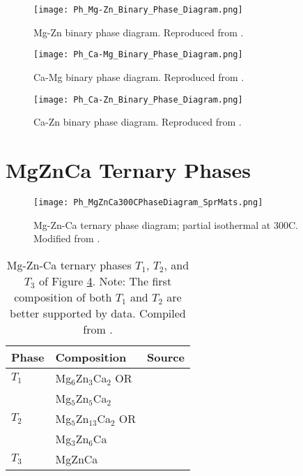 \documentclass[a4paper,12pt,oneside]{report}%
\begin{document}
\begin{figure}[h]
	\centering
	\texttt{[image: Ph\_Mg-Zn\_Binary\_Phase\_Diagram.png]}
	\caption[Mg-Zn binary phase diagram.]{Mg-Zn binary phase diagram. Reproduced from \cite{Predel1997}.}
	\label{fig:MgZnDiagram}
\end{figure}

\begin{figure}[h]
	\centering
	\texttt{[image: Ph\_Ca-Mg\_Binary\_Phase\_Diagram.png]}
	\caption[Ca-Mg binary phase diagram.]{Ca-Mg binary phase diagram. Reproduced from \cite{Nayeb1987}.}
	\label{fig:CaMgDiagram}
\end{figure}

\begin{figure}[h]
	\centering
	\texttt{[image: Ph\_Ca-Zn\_Binary\_Phase\_Diagram.png]}
	\caption[Ca-Zn binary phase diagram.]{Ca-Zn binary phase diagram. Reproduced from \cite{Messing1963}.}
	\label{fig:CaZnDiagram}
\end{figure}

\clearpage
\newpage

\section{MgZnCa Ternary Phases} \label{sec:TernaryPhases}

\begin{figure}[htb]
	\centering
	\texttt{[image: Ph\_MgZnCa300CPhaseDiagram\_SprMats.png]}
	\caption[Mg-Zn-Ca ternary phase diagram; partial isothermal at 300\degree C.]{Mg-Zn-Ca ternary phase diagram; partial isothermal at 300\degree C. Modified from \cite{Melnik1978}.}
	\label{fig:MgZnCa300PhaseD}
\end{figure}

\begin{table}[H]
	\centering
	\begin{tabular}{ l l l }
		\toprule
		Phase & Composition & Source \\
		\midrule
		$T_{1}$ & Mg$_{6}$Zn$_{3}$Ca$_{2}$ OR & \cite{Clark1961} \\
		& Mg$_{5}$Zn$_{5}$Ca$_{2}$ & \\
		$T_{2}$	& Mg$_{5}$Zn$_{13}$Ca$_{2}$ OR & \cite{Clark1961} \\
		& Mg$_{3}$Zn$_{6}$Ca & \\
		$T_{3}$	& MgZnCa & \cite{Schulze1961} \\
		\bottomrule
	\end{tabular}
	\caption[Mg-Zn-Ca ternary phases $T_{1}$, $T_{2}$, and $T_{3}$ of Figure \ref{fig:MgZnCa300PhaseD}. Note: The first composition of both $T_{1}$ and $T_{2}$ are better supported by data.]{Mg-Zn-Ca ternary phases $T_{1}$, $T_{2}$, and $T_{3}$ of Figure \ref{fig:MgZnCa300PhaseD}. Note: The first composition of both $T_{1}$ and $T_{2}$ are better supported by data. Compiled from \cite{Clark1961, Schulze1961}.}
	\label{tab:SputterParameters}
\end{table}
\end{document}
